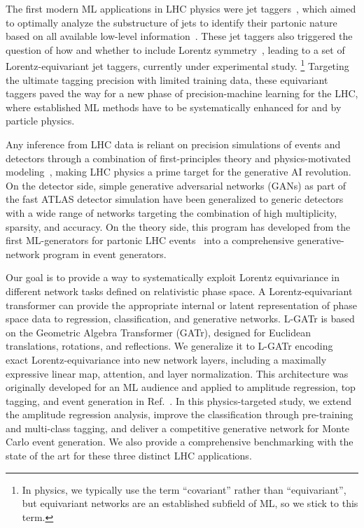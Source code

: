 \documentclass[submission, Phys]{SciPost}
\begin{document}
The first modern ML applications in LHC physics were jet taggers~\cite{Kasieczka:2019dbj,Nachman:2022emq}, which aimed to optimally analyze the substructure of jets to identify their partonic nature based on all available low-level information~\cite{deOliveira:2015xxd,Kasieczka:2017nvn}.
%
These jet taggers also triggered the question of how and whether to include Lorentz symmetry~\cite{Butter:2017cot}, leading to a set of Lorentz-equivariant jet taggers, currently under experimental study.%
%
\footnote{In physics, we typically use the term ``covariant'' rather than ``equivariant'', but equivariant networks are an established subfield of ML, so we stick to this term.}
%
Targeting the ultimate tagging precision with limited training data, these equivariant taggers paved the way for a new phase of precision-machine learning for the LHC, where established ML methods have to be systematically enhanced for and by particle physics.

Any inference from LHC data is reliant on precision simulations of events and detectors through a combination of first-principles theory and physics-motivated modeling~\cite{Butter:2022rso,Campbell:2022qmc}, making LHC physics a prime target for the generative AI revolution. On the detector side, simple generative adversarial networks (GANs) as part of the fast ATLAS detector simulation have been generalized to generic detectors with a wide range of networks targeting the combination of high multiplicity, sparsity, and accuracy.
On the theory side, this program has developed from the first ML-generators for partonic LHC events~\cite{Otten:2019hhl,Hashemi:2019fkn,Butter:2019cae} into a comprehensive generative-network program in event generators.

Our goal is to provide a way to systematically exploit Lorentz equivariance in different network tasks defined on relativistic phase space. A Lorentz-equivariant transformer can provide the appropriate internal or latent representation of phase space data to regression, classification, and generative networks. L-GATr is based on the Geometric Algebra Transformer (GATr), designed for Euclidean translations, rotations, and reflections. We generalize it to L-GATr encoding exact Lorentz-equivariance into new network layers, including a maximally expressive linear map, attention, and layer normalization. This architecture was originally developed for an ML audience and applied to amplitude regression, top tagging, and event generation in Ref.~\cite{Spinner:2024hjm}. In this physics-targeted study, we extend the amplitude regression analysis, improve the classification through pre-training and multi-class tagging, and deliver a competitive generative network for Monte Carlo event generation. We also provide a comprehensive benchmarking with the state of the art for these three distinct LHC applications.
\end{document}
